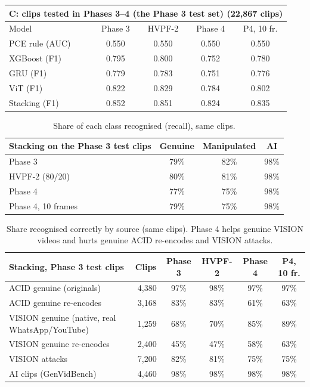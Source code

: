 \documentclass[11pt,a4paper]{article}
\begin{document}
\begin{table}[H]\centering\small\setlength{\tabcolsep}{4pt}\begin{tabular}{lcccc}\toprule \multicolumn{5}{l}{\textbf{C: clips tested in Phases 3--4 (the Phase 3 test set)} (22,867 clips)} \\\midrule Model & Phase 3 & HVPF-2 & Phase 4 & P4, 10 fr. \\\midrule
PCE rule (AUC) & 0.550 & 0.550 & 0.550 & 0.550 \\
XGBoost (F1) & 0.795 & 0.800 & 0.752 & 0.780 \\
GRU (F1) & 0.779 & 0.783 & 0.751 & 0.776 \\
ViT (F1) & 0.822 & 0.829 & 0.784 & 0.802 \\
Stacking (F1) & 0.852 & 0.851 & 0.824 & 0.835 \\
\bottomrule\end{tabular}\end{table}
\begin{table}[H]\centering\small\begin{tabular}{lccc}\toprule Stacking on the Phase 3 test clips & Genuine & Manipulated & AI \\\midrule
Phase 3 & 79\% & 82\% & 98\% \\
HVPF-2 (80/20) & 80\% & 81\% & 98\% \\
Phase 4 & 77\% & 75\% & 98\% \\
Phase 4, 10 frames & 79\% & 75\% & 98\% \\
\bottomrule\end{tabular}\caption{Share of each class recognised (recall), same clips.}\end{table}
\begin{table}[H]\centering\small\begin{tabular}{lrcccc}\toprule Stacking, Phase 3 test clips & Clips & Phase 3 & HVPF-2 & Phase 4 & P4, 10 fr. \\\midrule
ACID genuine (originals) & 4,380 & 97\% & 98\% & 97\% & 97\% \\
ACID genuine re-encodes & 3,168 & 83\% & 83\% & 61\% & 63\% \\
VISION genuine (native, real WhatsApp/YouTube) & 1,259 & 68\% & 70\% & 85\% & 89\% \\
VISION genuine re-encodes & 2,400 & 45\% & 47\% & 58\% & 63\% \\
VISION attacks & 7,200 & 82\% & 81\% & 75\% & 75\% \\
AI clips (GenVidBench) & 4,460 & 98\% & 98\% & 98\% & 98\% \\
\bottomrule\end{tabular}\caption{Share recognised correctly by source (same clips). Phase 4 helps genuine VISION videos and hurts genuine ACID re-encodes and VISION attacks.}\label{tab:source}\end{table}
\end{document}
